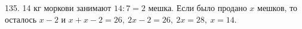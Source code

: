 135. 14 кг моркови занимают $14:7=2$ мешка. Если было продано $x$ мешков, то осталось $x-2$ и $x+x-2=26,\ 2x-2=26,\ 2x=28,\ x=14.$\\
